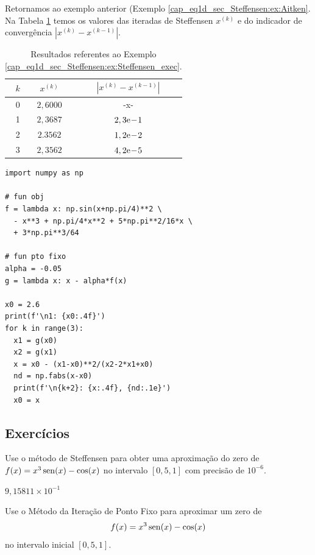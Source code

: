 \begin{ex}\label{cap_eq1d_sec_Steffensen:ex:Steffensen_exec}
  Retornamos ao exemplo anterior (Exemplo \ref{cap_eq1d_sec_Steffensen:ex:Aitken}. Na Tabela \ref{cap_eq1d_sec_Steffensen:tab:ex_Steffensen_exec} temos os valores das iteradas de Steffensen $x^{(k)}$ e do indicador de convergência $|x^{(k)}-x^{(k-1)}|$.

\begin{table}[h!]
  \centering
  \caption{Resultados referentes ao Exemplo \ref{cap_eq1d_sec_Steffensen:ex:Steffensen_exec}.}
  \label{cap_eq1d_sec_Steffensen:tab:ex_Steffensen_exec}
  \begin{tabular}{r|cc}
    $k$ & $x^{(k)}$ & $|x^{(k)}-x^{(k-1)}|$ \\\hline
    0 & $2,6000$ & -x- \\
    1 & $2,3687$ & $2,3\mathrm{e}\!-\!1$ \\
    2 & $2.3562$ & $1,2\mathrm{e}\!-\!2$ \\
    3 & $2,3562$ & $4,2\mathrm{e}\!-\!5$ \\\hline
  \end{tabular}
\end{table}

\begin{lstlisting}
import numpy as np

# fun obj
f = lambda x: np.sin(x+np.pi/4)**2 \
  - x**3 + np.pi/4*x**2 + 5*np.pi**2/16*x \
  + 3*np.pi**3/64

# fun pto fixo
alpha = -0.05
g = lambda x: x - alpha*f(x)

x0 = 2.6
print(f'\n1: {x0:.4f}')
for k in range(3):
  x1 = g(x0)
  x2 = g(x1)
  x = x0 - (x1-x0)**2/(x2-2*x1+x0)
  nd = np.fabs(x-x0)
  print(f'\n{k+2}: {x:.4f}, {nd:.1e}')
  x0 = x
\end{lstlisting}

\end{ex}

\subsection*{Exercícios}

\begin{exer}
  Use o método de Steffensen para obter uma aproximação do zero de $f(x)=x^3\operatorname{sen}(x)-\cos(x)$ no intervalo $[0,5, 1]$ com precisão de $10^{-6}$.
\end{exer}
\begin{resp}
    $9,15811\times 10^{-1}$
\end{resp}

\begin{exer}
  Use o Método da Iteração de Ponto Fixo para aproximar um zero de
  \begin{equation}
    f(x)=x^3\operatorname{sen}(x)-\cos(x)
  \end{equation}
  no intervalo inicial $[0,5, 1]$.
\end{exer}

